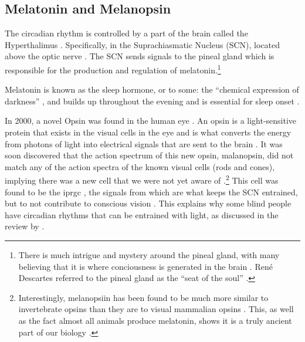 \subsection{Melatonin and Melanopsin}

The circadian rhythm is controlled by a part of the brain called the Hyperthalimus \citep{stephanCircadianRhythmsDrinking1972}. Specifically, in the Suprachiasmatic Nucleus (SCN), located above the optic nerve \citep{welshIndividualNeuronsDissociated1995}. The SCN sends signals to the pineal gland \citep{cassoneMelatoninRoleVertebrate1998, borjiginPINEALGLANDMELATONIN1999} which is responsible for the production and regulation of melatonin.\footnote{
There is much intrigue and mystery around the pineal gland, with many believing that it is where conciousness is generated in the brain \citep{bobMelatoninConsciousnessTraumatic2008}. Ren\'e Descartes referred to the pineal gland as the ``seat of the soul'' \citep{lokhorstDescartesPinealGland2020}.
}

Melatonin is known as the sleep hormone, or to some: the ``chemical expression of darkness'' \citep{reiterMelatoninChemicalExpression1991}, and builds up throughout the evening and is essential for sleep onset \citep{arendtImportanceRelevanceMelatonin2003}.

In 2000, a novel Opsin was found in the human eye \citep{provencioNovelHumanOpsin2000}. An opsin is a light-sensitive protein that exists in the visual cells in the eye and is what converts the energy from photons of light into electrical signals that are sent to the brain \citep{terakitaOpsins2005}. It was soon discovered that the action spectrum of this new opsin, malanopsin, did not match any of the action spectra of the known visual cells (rods and cones), implying there was a new cell that we were not yet aware of \citep{thapanActionSpectrumMelatonin2001}.\footnote{
Interestingly, melanopsiin has been found to be much more similar to invertebrate opsins than they are to visual mammalian opsins \citep{provencioMelanopsinOpsinMelanophores1998}. This, as well as the fact almost all animals produce melatonin, shows it is a truly ancient part of our biology \citep{daviesEvolutionFunctionMelanopsin2014}.
} 
This cell was found to be the \acrfull{iprgc} \citep{bersonPhototransductionRetinalGanglion2002}, the signals from which are what keeps the SCN entrained, but to not contribute to conscious vision \citep{bersonPhototransductionGanglioncellPhotoreceptors2007}. This explains why some blind people have circadian rhythms that can be entrained with light, as discussed in the review by \citet{allenCircadianRhythmsBlind2019}.

